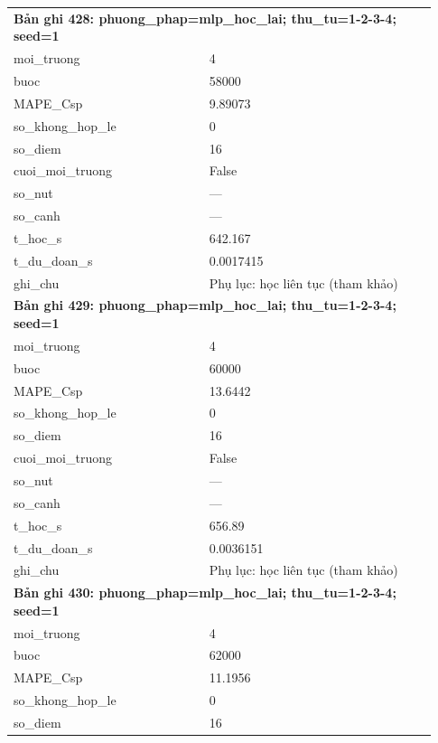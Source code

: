 \begin{longtable}{p{0.43\linewidth}p{0.50\linewidth}}
\midrule
\multicolumn{2}{p{0.95\linewidth}}{\textbf{Bản ghi 428: phuong\_phap=mlp\_hoc\_lai; thu\_tu=1-2-3-4; seed=1}} \\
moi\_\allowbreak truong & 4 \\
buoc & 58000 \\
MAPE\_\allowbreak Csp & 9.89073 \\
so\_\allowbreak khong\_\allowbreak hop\_\allowbreak le & 0 \\
so\_\allowbreak diem & 16 \\
cuoi\_\allowbreak moi\_\allowbreak truong & False \\
so\_\allowbreak nut & — \\
so\_\allowbreak canh & — \\
t\_\allowbreak hoc\_\allowbreak s & 642.167 \\
t\_\allowbreak du\_\allowbreak doan\_\allowbreak s & 0.0017415 \\
ghi\_\allowbreak chu & Phụ lục: học liên tục (tham khảo) \\
\midrule
\multicolumn{2}{p{0.95\linewidth}}{\textbf{Bản ghi 429: phuong\_phap=mlp\_hoc\_lai; thu\_tu=1-2-3-4; seed=1}} \\
moi\_\allowbreak truong & 4 \\
buoc & 60000 \\
MAPE\_\allowbreak Csp & 13.6442 \\
so\_\allowbreak khong\_\allowbreak hop\_\allowbreak le & 0 \\
so\_\allowbreak diem & 16 \\
cuoi\_\allowbreak moi\_\allowbreak truong & False \\
so\_\allowbreak nut & — \\
so\_\allowbreak canh & — \\
t\_\allowbreak hoc\_\allowbreak s & 656.89 \\
t\_\allowbreak du\_\allowbreak doan\_\allowbreak s & 0.0036151 \\
ghi\_\allowbreak chu & Phụ lục: học liên tục (tham khảo) \\
\midrule
\multicolumn{2}{p{0.95\linewidth}}{\textbf{Bản ghi 430: phuong\_phap=mlp\_hoc\_lai; thu\_tu=1-2-3-4; seed=1}} \\
moi\_\allowbreak truong & 4 \\
buoc & 62000 \\
MAPE\_\allowbreak Csp & 11.1956 \\
so\_\allowbreak khong\_\allowbreak hop\_\allowbreak le & 0 \\
so\_\allowbreak diem & 16 \\

\end{longtable}
